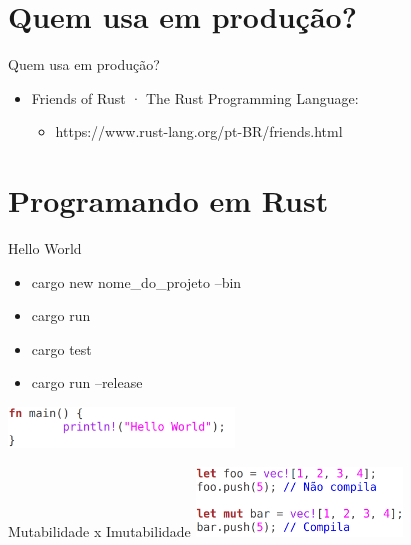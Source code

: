 \documentclass[aspectratio=169]{beamer}
\begin{document}
\section{Quem usa em produção?}

\begin{frame}{Quem usa em produção?}
	\begin{itemize}
		\item Friends of Rust · The Rust Programming Language:
		\begin{itemize}
			\item https://www.rust-lang.org/pt-BR/friends.html
		\end{itemize}
	\end{itemize}
\end{frame}

\section{Programando em Rust}
\begin{frame}{Hello World}
	\begin{itemize}
		\item cargo new nome\_do\_projeto --bin
		\item cargo run
		\item cargo test
		\item cargo run --release
	\end{itemize}
	
	\vspace{1cm}
	
	\includegraphics[width=6.0cm]{imgs/hello_world.png}	
\end{frame}

\begin{frame}{Mutabilidade x Imutabilidade}
	\includegraphics[width=5.5cm]{imgs/mut_x_imut.png}	
\end{frame}

\end{document}
